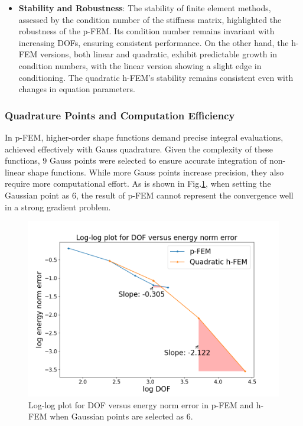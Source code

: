 \documentclass[twoside,twocolumn,10pt]{article}
\begin{document}
\begin{itemize}
    
    \item \textbf{Stability and Robustness}: The stability of finite element methods, assessed by the condition number of the stiffness matrix, highlighted the robustness of the p-FEM. Its condition number remains invariant with increasing DOFs, ensuring consistent performance. On the other hand, the h-FEM versions, both linear and quadratic, exhibit predictable growth in condition numbers, with the linear version showing a slight edge in conditioning. The quadratic h-FEM's stability remains consistent even with changes in equation parameters.
    
\end{itemize}

\subsubsection{Quadrature Points and Computation Efficiency}
In p-FEM, higher-order shape functions demand precise integral evaluations, achieved effectively with Gauss quadrature. Given the complexity of these functions, 9 Gauss points were selected to ensure accurate integration of non-linear shape functions. While more Gauss points increase precision, they also require more computational effort. As is shown in Fig.\ref{fig:h_p_error_5_6}, when setting the Gaussian point as 6, the result of p-FEM cannot represent the convergence well in a strong gradient problem.

\begin{figure}[!ht]
  \centering
  \includegraphics[width=1.\linewidth]{Q1/h_p_error_5_3.png}
  \caption{Log-log plot for DOF versus energy norm error in p-FEM and h-FEM when Gaussian points are selected as 6.}
  \label{fig:h_p_error_5_6}
\end{figure}
\end{document}
